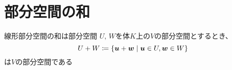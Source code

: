 \documentclass[../../../topic_linear-algebra]{subfiles}
\begin{document}
\sectionline
\section{部分空間の和}

\begin{mindflow}
\end{mindflow}

\begin{theorem}{線形部分空間の和は部分空間}
  $U,\,W$を体$K$上の$V$の部分空間とするとき、
  \begin{equation*}
    U + W \coloneq \{ \vb*{u} + \vb*{w} \mid \vb*{u} \in U, \vb*{w} \in W \}
  \end{equation*}
  は$V$の部分空間である
\end{theorem}
\end{document}
